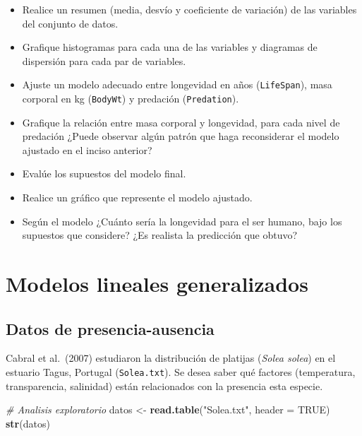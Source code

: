 \documentclass[
]{book}
\newenvironment{Shaded}{\begin{snugshade}}{\end{snugshade}}
\newcommand{\CommentTok}[1]{\textcolor[rgb]{0.56,0.35,0.01}{\textit{#1}}}
\newcommand{\DataTypeTok}[1]{\textcolor[rgb]{0.13,0.29,0.53}{#1}}
\newcommand{\KeywordTok}[1]{\textcolor[rgb]{0.13,0.29,0.53}{\textbf{#1}}}
\newcommand{\NormalTok}[1]{#1}
\newcommand{\OtherTok}[1]{\textcolor[rgb]{0.56,0.35,0.01}{#1}}
\newcommand{\StringTok}[1]{\textcolor[rgb]{0.31,0.60,0.02}{#1}}
\begin{document}
\begin{itemize}
\item
  Realice un resumen (media, desvío y coeficiente de variación) de las variables del conjunto de datos.
\item
  Grafique histogramas para cada una de las variables y diagramas de dispersión para cada par de variables.
\item
  Ajuste un modelo adecuado entre longevidad en años (\texttt{LifeSpan}), masa corporal en kg (\texttt{BodyWt}) y predación (\texttt{Predation}).
\item
  Grafique la relación entre masa corporal y longevidad, para cada nivel de predación ¿Puede observar algún patrón que haga reconsiderar el modelo ajustado en el inciso anterior?
\item
  Evalúe los supuestos del modelo final.
\item
  Realice un gráfico que represente el modelo ajustado.
\item
  Según el modelo ¿Cuánto sería la longevidad para el ser humano, bajo los supuestos que considere? ¿Es realista la predicción que obtuvo?
\end{itemize}

\hypertarget{modelos-lineales-generalizados}{%
\chapter{Modelos lineales generalizados}\label{modelos-lineales-generalizados}}

\hypertarget{datos-de-presencia-ausencia}{%
\section{Datos de presencia-ausencia}\label{datos-de-presencia-ausencia}}

Cabral et al.~(2007) estudiaron la distribución de platijas (\emph{Solea solea}) en el estuario Tagus, Portugal (\texttt{Solea.txt}). Se desea saber qué factores (temperatura, transparencia, salinidad) están relacionados con la presencia esta especie.

\begin{Shaded}
\begin{Highlighting}[]
\CommentTok{# Analisis exploratorio}
\NormalTok{datos <-}\StringTok{ }\KeywordTok{read.table}\NormalTok{(}\StringTok{"Solea.txt"}\NormalTok{, }\DataTypeTok{header =} \OtherTok{TRUE}\NormalTok{)}
\KeywordTok{str}\NormalTok{(datos)}
\end{Highlighting}
\end{Shaded}
\end{document}
